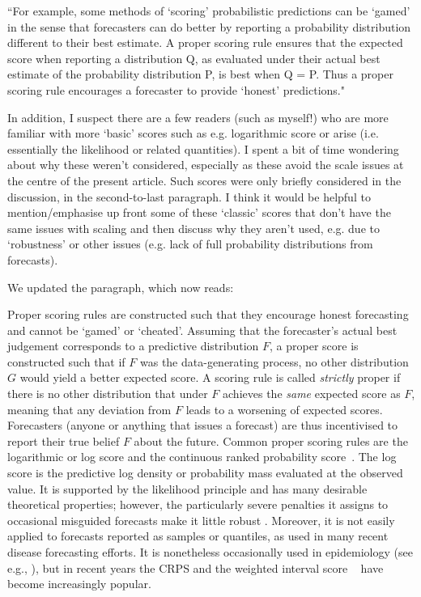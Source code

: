 \documentclass{article}
\newcommand{\black}{\color{black}}
\newcommand{\indented}{\setlength{\leftskip}{1cm}}
\begin{document}
“For example, some methods of ‘scoring’ probabilistic predictions can be ‘gamed’ in the sense that forecasters can do better by reporting a probability distribution different to their best estimate. A proper scoring rule ensures that the expected score when reporting a distribution Q, as evaluated under their actual best estimate of the probability distribution P, is best when Q = P. Thus a proper scoring rule encourages a forecaster to provide ‘honest’ predictions."

In addition, I suspect there are a few readers (such as myself!) who are more familiar with more ‘basic’ scores such as e.g. logarithmic score or arise (i.e. essentially the likelihood or related quantities). I spent a bit of time wondering about why these weren’t considered, especially as these avoid the scale issues at the centre of the present article. Such scores were only briefly considered in the discussion, in the second-to-last paragraph. I think it would be helpful to mention/emphasise up front some of these ‘classic’ scores that don’t have the same issues with scaling and then discuss why they aren’t used, e.g. due to ‘robustness’ or other issues (e.g. lack of full probability distributions from forecasts).

\black
We updated the paragraph, which now reads: 

\indented

Proper scoring rules are constructed such that they encourage honest forecasting and cannot be `gamed' or `cheated'. 
Assuming that the forecaster's actual best judgement corresponds to a predictive distribution $F$, a proper score is constructed such that if $F$ was the data-generating process, no other distribution $G$ would yield a better expected score. A scoring rule is called \textit{strictly} proper if there is no other distribution that under $F$ achieves the \textit{same} expected score as $F$, meaning that any deviation from $F$ leads to a worsening of expected scores. Forecasters (anyone or anything that issues a forecast) are thus incentivised to report their true belief $F$ about the future. 
Common proper scoring rules are the logarithmic or log score \citep{goodRationalDecisions1952} and the continuous ranked probability score~\citep[CRPS,][]{gneitingStrictlyProperScoring2007}. The log score is the predictive log density or probability mass evaluated at the observed value. It is supported by the likelihood principle \citep{Winkler1996} and has many desirable theoretical properties; however, the particularly severe penalties it assigns to occasional misguided forecasts make it little robust \citep{bracherEvaluatingEpidemicForecasts2021}. Moreover, it is not easily applied to forecasts reported as samples or quantiles, as used in many recent disease forecasting efforts. It is nonetheless occasionally used in epidemiology (see e.g., \citealt{heldProbabilisticForecastingInfectious2017, Johansson2019}), but in recent years the CRPS and the weighted interval score ~\citep[WIS,][]{bracherEvaluatingEpidemicForecasts2021} have become increasingly popular. 
\end{document}
